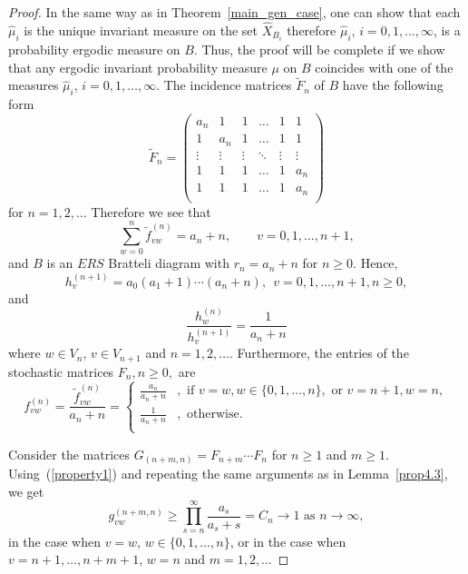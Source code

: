 \documentclass[11pt, english, reqno]{amsart}
\theoremstyle{definition}
\theoremstyle{remark}
\theoremstyle{plain}
\def\tl{\widetilde}
\def\wh{\widehat}
\numberwithin{equation}{section}
\begin{document}
{\begin{proof}
In the same way as in Theorem~\ref{main_gen_case}, one can show that
each $\wh{\mu}_i$ is the unique invariant measure on the set
$\wh{X}_{B_i}$ therefore $\wh{\mu}_i$, $i = 0,1,\ldots,\infty$, is a
probability ergodic measure on $B$. Thus, the proof will be complete
if we show that any ergodic invariant probability measure $\mu$ on $B$
 coincides
with one of the measures $\wh{\mu}_i$, $i = 0,1,\ldots,\infty$.
The incidence matrices $\tl F_n$ of $B$ have the following form
$$
\tl F_n =
\begin{pmatrix}
a_n & 1 & 1 & \ldots & 1 & 1\\
1 & a_n & 1 & \ldots & 1 & 1\\
\vdots & \vdots & \vdots & \ddots & \vdots & \vdots \\
1 & 1 & 1 & \ldots & 1 & a_n\\
1 & 1 & 1 & \ldots & 1 & a_n\\
\end{pmatrix}
$$
for $n = 1,2,\ldots$
Therefore we see that
$$
\sum_{w = 0}^n \tl f_{vw}^{(n)} = a_n + n, \qquad v = 0,1,\ldots, n + 1,
$$
and $B$ is an $ERS$ Bratteli diagram with $r_n = a_n + n$ for $n \geq 0$.
Hence,
$$
h_v^{(n+1)} = a_0 (a_1 + 1) \cdots (a_n + n), \ \ v = 0,1,\ldots, n+1,
n\geq 0,
$$
 and
$$
\frac{h_w^{(n)}}{h_v^{(n + 1)}} = \frac{1}{a_n + n}
$$
where $w \in V_n$, $v \in V_{n+1}$ and $n = 1,2,\ldots$.
Furthermore, the entries of the stochastic matrices $F_n, n \geq 0,$ are
$$
f_{vw}^{(n)} = \frac{\tl f_{vw}^{(n)}}{a_n + n} =
\left\{
\begin{aligned}
\frac{a_n}{a_n + n} &, \mbox{ if } v = w, w \in \{0,1,\ldots, n\},
 \mbox{ or } v = n + 1, w = n,\\
\frac{1}{a_n + n} &, \mbox{ otherwise}.\\
\end{aligned}
\right.
$$

Consider the matrices $G_{(n+m,n)} = F_{n+m}\cdots F_n$ for $n \geq 1$
and $m \geq 1$. Using~(\ref{property1}) and repeating the same arguments
as in Lemma~\ref{prop4.3}, we get
\begin{equation}\label{property2}
g_{vw}^{(n+m,n)} \geq \prod_{s = n}^{\infty} \frac{a_s}{a_s + s} =
C_n \to 1 \mbox{ as } n\rightarrow \infty,
\end{equation}
in the case when $v = w$, $w \in \{0,1,\ldots, n\}$,
 or in the case when $v = n + 1, \ldots, n + m + 1$, $w = n$ and
 $m = 1,2, \ldots$


\end{proof}}
\end{document}
